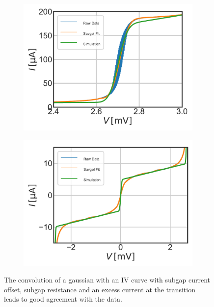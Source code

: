 \documentclass[]{article}
\begin{document}
\begin{figure}
	\centering              
	\begin{subfigure}[t]{0.49\textwidth}
		\centering
		\includegraphics[width=\linewidth]{./../IV_Class_Unit_Test/2020_01_14/Simulation_Stepwise_Transission.pdf}
	\end{subfigure}
	\begin{subfigure}[t]{0.49\textwidth}
		\centering
		\includegraphics[width=\linewidth]{./../IV_Class_Unit_Test/2020_01_14/Simulation_Stepwise_Subgap.pdf}
	\end{subfigure}
	\caption[]{The convolution of a gaussian with an IV curve with subgap current offset, subgap resistance and an excess current at the transition leads to good agreement with the data. 
	}
	\label{fig:Simulation_Stepwise}
\end{figure}
\end{document}
